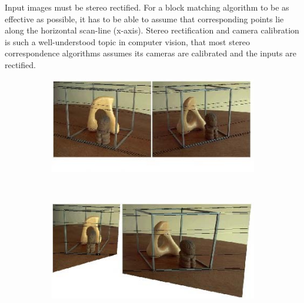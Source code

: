 Input images must be stereo rectified. For a block matching algorithm
to be as effective as possible, it has to be able to assume that
corresponding points lie along the horizontal scan-line
(x-axis). Stereo rectification and camera calibration is such a
well-understood topic in computer vision, that most stereo
correspondence algorithms assumes its cameras are calibrated and the
inputs are rectified.

\begin{figure}

  \begin{subfigure}[b]{0.48\textwidth}
    \centering
    \includegraphics[width=\textwidth]{images/rectification-example.png}
    \caption{}
  \end{subfigure}
  ~
  \begin{subfigure}[b]{0.48\textwidth}
    \centering
    \includegraphics[width=\textwidth]{images/rectification-example-2.png}
    \caption{}
  \end{subfigure}


\end{figure}
